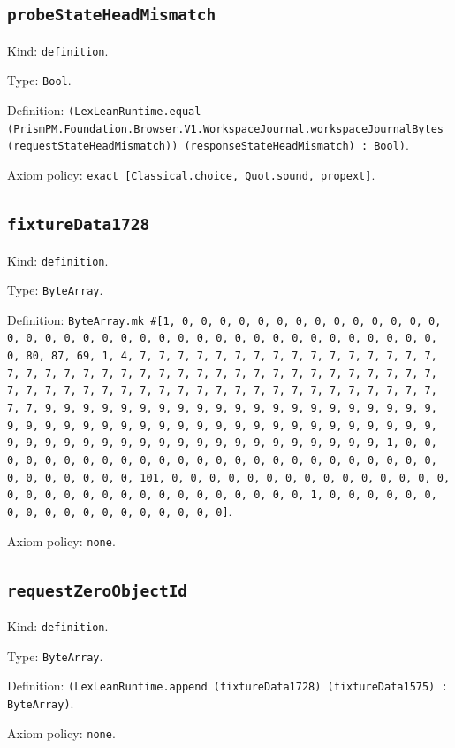 \documentclass[11pt]{article}
\begin{document}
\subsection*{\texttt{probeStateHeadMismatch}}
\noindent Kind: \texttt{definition}.\par
\noindent Type: \texttt{Bool}.\par
\noindent Definition: \texttt{(LexLeanRuntime.equal (PrismPM.Foundation.Browser.V1.WorkspaceJournal.workspaceJournalBytes (requestStateHeadMismatch)) (responseStateHeadMismatch) : Bool)}.\par
\noindent Axiom policy: \texttt{exact [Classical.choice, Quot.sound, propext]}.\par
\subsection*{\texttt{fixtureData1728}}
\noindent Kind: \texttt{definition}.\par
\noindent Type: \texttt{ByteArray}.\par
\noindent Definition: \texttt{ByteArray.mk \#[1, 0, 0, 0, 0, 0, 0, 0, 0, 0, 0, 0, 0, 0, 0, 0, 0, 0, 0, 0, 0, 0, 0, 0, 0, 0, 0, 0, 0, 0, 0, 0, 0, 0, 0, 0, 0, 0, 0, 80, 87, 69, 1, 4, 7, 7, 7, 7, 7, 7, 7, 7, 7, 7, 7, 7, 7, 7, 7, 7, 7, 7, 7, 7, 7, 7, 7, 7, 7, 7, 7, 7, 7, 7, 7, 7, 7, 7, 7, 7, 7, 7, 7, 7, 7, 7, 7, 7, 7, 7, 7, 7, 7, 7, 7, 7, 7, 7, 7, 7, 7, 7, 7, 7, 7, 7, 7, 7, 9, 9, 9, 9, 9, 9, 9, 9, 9, 9, 9, 9, 9, 9, 9, 9, 9, 9, 9, 9, 9, 9, 9, 9, 9, 9, 9, 9, 9, 9, 9, 9, 9, 9, 9, 9, 9, 9, 9, 9, 9, 9, 9, 9, 9, 9, 9, 9, 9, 9, 9, 9, 9, 9, 9, 9, 9, 9, 9, 9, 9, 9, 9, 9, 1, 0, 0, 0, 0, 0, 0, 0, 0, 0, 0, 0, 0, 0, 0, 0, 0, 0, 0, 0, 0, 0, 0, 0, 0, 0, 0, 0, 0, 0, 0, 0, 0, 101, 0, 0, 0, 0, 0, 0, 0, 0, 0, 0, 0, 0, 0, 0, 0, 0, 0, 0, 0, 0, 0, 0, 0, 0, 0, 0, 0, 0, 0, 0, 0, 1, 0, 0, 0, 0, 0, 0, 0, 0, 0, 0, 0, 0, 0, 0, 0, 0, 0, 0]}.\par
\noindent Axiom policy: \texttt{none}.\par
\subsection*{\texttt{requestZeroObjectId}}
\noindent Kind: \texttt{definition}.\par
\noindent Type: \texttt{ByteArray}.\par
\noindent Definition: \texttt{(LexLeanRuntime.append (fixtureData1728) (fixtureData1575) : ByteArray)}.\par
\noindent Axiom policy: \texttt{none}.\par
\end{document}
